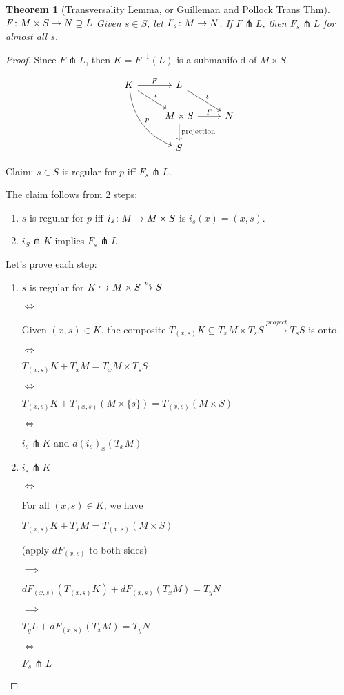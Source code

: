 \documentclass[11pt]{amsbook}
\theoremstyle{mystyle} %
\newtheorem{thrm}[thm]{Theorem}
\numberwithin{thm}{section}
\newcommand{\transverse}{\pitchfork}
\newcommand{\x}{\times}
\begin{document}
\begin{thrm}[Transversality Lemma, or Guilleman and Pollock Trans Thm]
	$F\from M \x S \to N \supseteq L$
	Given $s \in S$, let $F_s\colon M \to N$.
	If $F \transverse L$, then $F_s \transverse L$ for almost all $s$.
\end{thrm}
\begin{proof}
	Since $F \transverse L$, then $K = F^{-1}(L)$ is a submanifold of $M \x S$.

	$$\begin{tikzcd}
		K \arrow[r, "F"] \arrow[rd, "\iota"] \arrow[rdd, "p", bend right] & L \arrow[rd, "\iota"] \\
		 & M \x S \arrow[r, "F"] \arrow[d, "\text{projection}"] & N \\
		 & S
	\end{tikzcd}$$

	Claim: $s \in S$ is regular for $p$ iff $F_s \transverse L$.

	The claim follows from 2 steps:
	\begin{enumerate}
		\item $s$ is regular for $p$ iff $i_s\from M \to M \x S$ is $i_s(x) = (x,s)$.
		\item $i_S \transverse K$ implies $F_s \transverse L$.
	\end{enumerate}

	Let's prove each step:
	\begin{enumerate}
		\item
			$s$ is regular for $K \into M \x S \overset{p_s}{\to} S$

			$\iff$

			Given $(x,s) \in K$, the composite $T_{(x,s)}K \subseteq T_xM \x T_sS \overset{project}{\to} T_sS$ is onto.

			$\iff$

			$T_{(x,s)}K + T_xM = T_xM \x T_sS$

			$\iff$

			$T_{(x,s)}K + T_{(x,s)}(M \x \{s\}) = T_{(x,s)}(M \x S)$

			$\iff$

			$i_s \transverse K$ and $d(i_s)_x(T_xM)$
		\item
			$i_s \transverse K$

			$\iff$

			For all $(x,s) \in K$, we have

			$T_{(x,s)}K + T_xM = T_{(x,s)}(M \x S)$

			(apply $dF_{(x,s)}$ to both sides)

			$\implies$

			$dF_{(x,s)}(T_{(x,s)}K) + dF_{(x,s)}(T_xM) = T_yN$

			$\implies$

			$T_yL + dF_{(x,s)}(T_xM) = T_yN$

			$\iff$

			$F_s \transverse L$
	\end{enumerate}
\end{proof}
\end{document}

